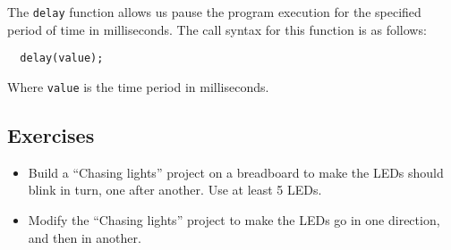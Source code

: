 \documentclass[../sparc.tex]{subfiles}
\begin{document}
The \texttt{delay} function allows us pause the program execution for the
specified period of time in milliseconds.  The call syntax for this function is
as follows:

\begin{verbatim}
  delay(value);
\end{verbatim}

Where \texttt{value} is the time period in milliseconds.

\subsection{Exercises}
\begin{itemize}
\item Build a ``Chasing lights'' project on a breadboard to make the LEDs should
  blink in turn, one after another.  Use at least 5 LEDs.
\item Modify the ``Chasing lights'' project to make the LEDs go in one
  direction, and then in another.
\end{itemize}
\end{document}
